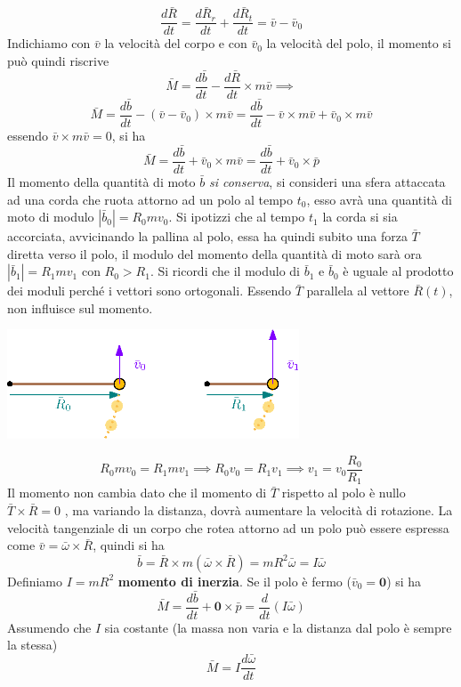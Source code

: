 \documentclass[10pt, letterpaper]{report}
\begin{document}
$$\frac{d\bar R}{dt}=\frac{d\bar R_r}{dt}+\frac{d\bar R_t}{dt} = \bar v - \bar v_0$$
Indichiamo con $\bar v$ la velocità del corpo e con $\bar v_0$ la velocità del polo, 
il momento si può quindi riscrive
$$\bar M=\frac{d\bar b}{dt}-\frac{d\bar R}{dt}\times m \bar v\implies $$
$$ \bar M = \frac{d\bar b}{dt} -  ( \bar v - \bar v_0)\times m \bar v=
\frac{d\bar b}{dt} -   \bar v\times m \bar v + \bar v_0\times m \bar v 
$$
essendo $\bar v\times m \bar v=0$, si ha
$$\bar M =  \frac{d\bar b}{dt} + \bar v_0\times m \bar v =\frac{d\bar b}{dt}+\bar v_0\times \bar p$$
Il momento della quantità di moto $\bar b$ \textit{si conserva}, si consideri una sfera 
attaccata ad una corda che ruota attorno ad un polo al tempo $t_0$, esso avrà una quantità di moto di modulo
$ |\bar b_0| = R_0mv_0$. Si ipotizzi che al tempo $t_1$ la corda si sia accorciata, avvicinando la 
pallina al polo, essa ha quindi subito una forza $\bar T$ diretta verso il polo, il modulo del momento 
della quantità di moto sarà ora $|\bar b_1|=R_1mv_1$ con $R_0>R_1$. Si ricordi che il modulo di $\bar b_1$ e $\bar b_0$ è uguale al prodotto dei moduli perché i vettori sono ortogonali. Essendo $\bar T$   parallela 
 al vettore $\bar R(t)$, non influisce sul momento.\begin{center}
    \includegraphics[width=0.65\textwidth]{images/conservMomento.eps}
 \end{center}
 $$ R_0mv_0=R_1mv_1\implies R_0v_0=R_1v_1\implies v_1=v_0\frac{R_0}{R_1}$$
Il momento non cambia dato che il momento di $\bar T$ rispetto al polo 
è nullo $\bar T \times \bar R =0$ , ma variando la distanza, dovrà aumentare la velocità di rotazione.\acc 
La velocità tangenziale di un corpo che rotea attorno ad un polo può essere espressa come $\bar v=\bar \omega \times \bar R$, 
quindi si ha 
$$ \bar b = \bar R \times m (\bar \omega\times  \bar R)=mR^2\bar \omega = I\bar \omega$$
Definiamo $I=mR^2$ \textbf{momento di inerzia}. Se il polo è fermo ($\bar v_0=\mathbf 0$) si ha 
$$ \bar M = \frac{d\bar b }{dt}+\mathbf 0 \times \bar p=\frac{d}{dt}(I\bar \omega)$$
Assumendo che $I$ sia costante (la massa non varia e la distanza dal polo è sempre la stessa)
$$ \bar M = I\frac{d\bar \omega}{dt}$$
\end{document}
